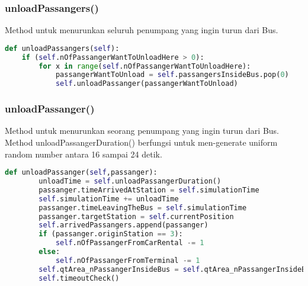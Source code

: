 \documentclass{article}
\begin{document}
\subsubsection{unloadPassangers()}
Method untuk menurunkan seluruh penumpang yang ingin turun dari Bus.
\begin{lstlisting}[language=Python]
def unloadPassangers(self):
	if (self.nOfPassangerWantToUnloadHere > 0):
		for x in range(self.nOfPassangerWantToUnloadHere):
			passangerWantToUnload = self.passangersInsideBus.pop(0)
			self.unloadPassanger(passangerWantToUnload)
\end{lstlisting}

\subsubsection{unloadPassanger()}
Method untuk menurunkan seorang penumpang yang ingin turun dari Bus. Method unloadPassangerDuration() berfungsi untuk men-generate uniform random number antara 16 sampai 24 detik.
\begin{lstlisting}[language=Python]
def unloadPassanger(self,passanger):
		unloadTime = self.unloadPassangerDuration()
		passanger.timeArrivedAtStation = self.simulationTime
		self.simulationTime += unloadTime
		passanger.timeLeavingTheBus = self.simulationTime
		passanger.targetStation = self.currentPosition
		self.arrivedPassangers.append(passanger)	
		if (passanger.originStation == 3):
			self.nOfPassangerFromCarRental -= 1
		else:
			self.nOfPassangerFromTerminal -= 1
		self.qtArea_nPassangerInsideBus = self.qtArea_nPassangerInsideBus + (self.simulationTime - passanger.timeEnteringTheBus)
		self.timeoutCheck()
\end{lstlisting}
\end{document}
